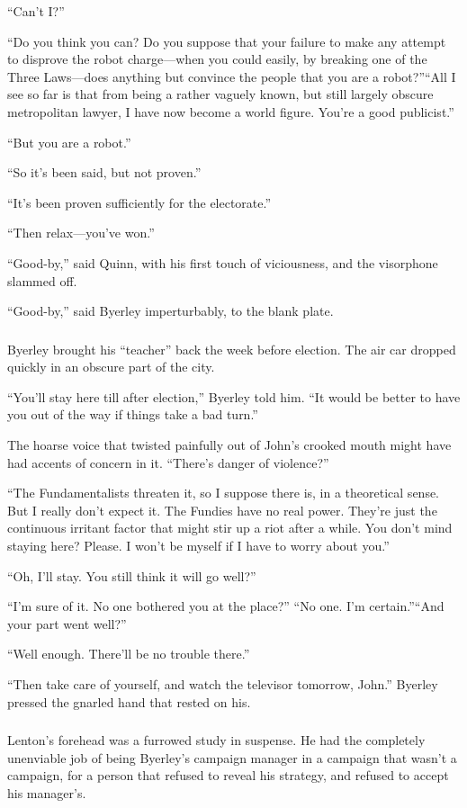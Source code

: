 \documentclass[10pt,a5paper,twoside]{book}
\begin{document}
“Can’t I?”

“Do you think you can? Do you suppose that your failure to make any attempt to disprove the robot charge—when you could easily, by breaking one of the Three Laws—does anything but convince the people that you are a robot?”“All I see so far is that from being a rather vaguely known, but still largely obscure metropolitan lawyer, I have now become a world figure. You’re a good publicist.”

“But you are a robot.”

“So it’s been said, but not proven.”

“It’s been proven sufficiently for the electorate.”

“Then relax—you’ve won.”

“Good-by,” said Quinn, with his first touch of viciousness, and the visorphone slammed off.

“Good-by,” said Byerley imperturbably, to the blank plate.

\subsubsection*{}
Byerley brought his “teacher” back the week before election. The air car dropped quickly in an obscure part of the city.

“You’ll stay here till after election,” Byerley told him. “It would be better to have you out of the way if things take a bad turn.”

The hoarse voice that twisted painfully out of John’s crooked mouth might have had accents of concern in it. “There’s danger of violence?”

“The Fundamentalists threaten it, so I suppose there is, in a theoretical sense. But I really don’t expect it. The Fundies have no real power. They’re just the continuous irritant factor that might stir up a riot after a while. You don’t mind staying here? Please. I won’t be myself if I have to worry about you.”

“Oh, I’ll stay. You still think it will go well?”

“I’m sure of it. No one bothered you at the place?” “No one. I’m certain.”“And your part went well?”

“Well enough. There’ll be no trouble there.”

“Then take care of yourself, and watch the televisor tomorrow, John.” Byerley pressed the gnarled hand that rested on his.

\subsubsection*{}
Lenton’s forehead was a furrowed study in suspense. He had the completely unenviable job of being Byerley’s campaign manager in a campaign that wasn’t a campaign, for a person that refused to reveal his strategy, and refused to accept his manager’s.
\end{document}
